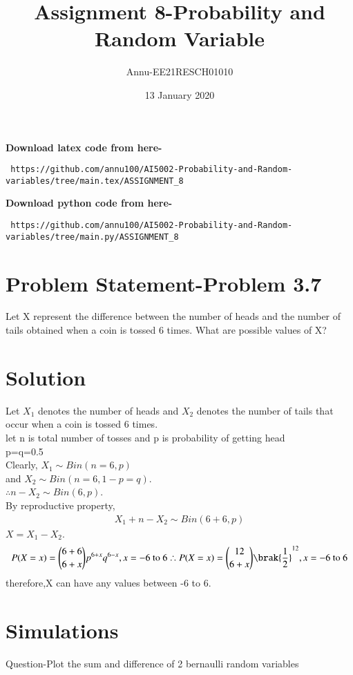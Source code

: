 \documentclass[journel,12pt,twocoloums]{IEEEtran}
\title{Assignment 8-Probability and Random Variable}
\author{Annu-EE21RESCH01010}
\date{13 January 2020}
\begin{document}
 \maketitle
\textbf{Download latex code from here-}\\
\begin{lstlisting}
 https://github.com/annu100/AI5002-Probability-and-Random-variables/tree/main.tex/ASSIGNMENT_8
 \end{lstlisting}
 \textbf{Download python code from here-}\\
\begin{lstlisting}
 https://github.com/annu100/AI5002-Probability-and-Random-variables/tree/main.py/ASSIGNMENT_8
 \end{lstlisting}
 \section{Problem Statement-Problem 3.7}


Let X represent the difference between the
number of heads and the number of tails
obtained when a coin is tossed 6 times. What
are possible values of X?
\section{Solution}
Let $X_1$ denotes the number of heads and $X_2$ denotes the number of tails that occur when a coin is tossed 6 times.\\

let n is total number of tosses and p is probability of getting head \\
p=q=0.5\\
Clearly, $X_1 \sim Bin(n=6,p)$\\
and $X_2 \sim Bin(n=6,1-p=q)$.\\
$\therefore n-X_2 \sim Bin(6, p)$.\\
By reproductive property,
\begin{align}
    X_1+n-X_2 \sim Bin(6+6, p)
\end{align}
$X=X_1-X_2$. 
\begin{align}
    P(X=x) = \binom{6+6}{6+x} p^{6+x} q^{6-x}, x= -6\ \text{to}\ 6 

    \therefore P(X=x) = \binom{12}{6+x}\brak{\frac{1}{2}}^{12},x= -6\ \text{to}\ 6 
\end{align}
 therefore,X can have any values between -6 to 6.
 

\section{Simulations}
Question-Plot the sum and difference of 2 bernaulli random variables\\
\end{document}
